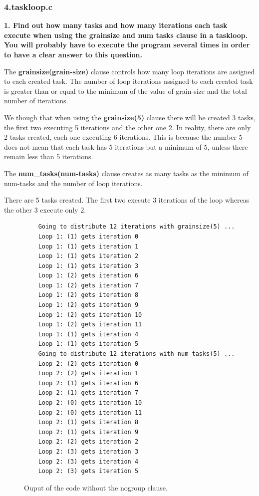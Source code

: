 \documentclass[12pt, a4paper]{article}
\begin{document}
\subsubsection{4.taskloop.c}

\textbf{1. Find out how many tasks and how many iterations each task execute when using the grainsize and num tasks clause in a taskloop. You will probably have to execute the program several times in order to have a clear answer to this question.}

The \textbf{grainsize(grain-size)} clause controls how many loop iterations are assigned to each created task. The number of loop iterations assigned to each created task is greater than or equal to the minimum of the value of grain-size and the total number of iterations.

We though that when using the \textbf{grainsize(5)} clause there will be created 3 tasks, the first two executing 5 iterations and the other one 2. In reality, there are only 2 tasks created, each one executing 6 iterations. This is because the number 5 does not mean that each task has 5 iterations but a minimum of 5, unless there remain less than 5 iterations.

The \textbf{num\_tasks(num-tasks)} clause creates as many tasks as the minimum of num-tasks and the number of loop iterations.

There are 5 tasks created. The first two execute 3 iterations of the loop whereas the other 3 execute only 2.

\begin{figure}[H]
	\begin{lstlisting}
	Going to distribute 12 iterations with grainsize(5) ...
	Loop 1: (1) gets iteration 0
	Loop 1: (1) gets iteration 1
	Loop 1: (1) gets iteration 2
	Loop 1: (1) gets iteration 3
	Loop 1: (2) gets iteration 6
	Loop 1: (2) gets iteration 7
	Loop 1: (2) gets iteration 8
	Loop 1: (2) gets iteration 9
	Loop 1: (2) gets iteration 10
	Loop 1: (2) gets iteration 11
	Loop 1: (1) gets iteration 4
	Loop 1: (1) gets iteration 5
	Going to distribute 12 iterations with num_tasks(5) ...
	Loop 2: (2) gets iteration 0
	Loop 2: (2) gets iteration 1
	Loop 2: (1) gets iteration 6
	Loop 2: (1) gets iteration 7
	Loop 2: (0) gets iteration 10
	Loop 2: (0) gets iteration 11
	Loop 2: (1) gets iteration 8
	Loop 2: (1) gets iteration 9
	Loop 2: (2) gets iteration 2
	Loop 2: (3) gets iteration 3
	Loop 2: (3) gets iteration 4
	Loop 2: (3) gets iteration 5
	\end{lstlisting}
	
	\caption{Ouput of the code without the nogroup clause.}
\end{figure}
\end{document}
